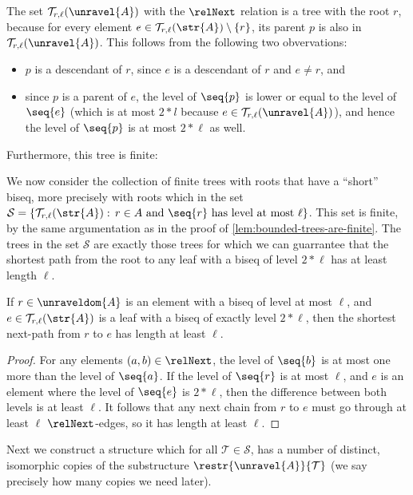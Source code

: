 \noindent
The set $\mathcal{T}_{r,\ell}(\unravel{A})$ with the $\relNext$ relation is a tree with the root $r$, because for every element $e \in \mathcal{T}_{r,\ell}(\str{A}) \setminus \{r\}$, its parent $p$ is also in $\mathcal{T}_{r,\ell}(\unravel{A})$.
This follows from the following two obvervations:
\begin{itemize}
  \item $p$ is a descendant of $r$, since $e$ is a descendant of $r$ and $e \neq r$, and
  \item since $p$ is a parent of $e$, the level of $\seq{p}$ is lower or equal to the level of $\seq{e}$ (which is at most $2 * l$ because $e \in \mathcal{T}_{r,\ell}(\unravel{A})$), and hence the level of $\seq{p}$ is at most $2 * \ell$ as well.
\end{itemize}
Furthermore, this tree is finite:

\noindent
We now consider the collection of finite trees with roots that have a ``short'' biseq, more precisely with roots which in the set $\mathcal{S} = \left\{ \mathcal{T}_{r,\ell}(\str{A}):\, r \in A \text{ and } \seq{r}\ \text{has level at most $\ell$}\right\}$.
This set is finite, by the same argumentation as in the proof of \cref{lem:bounded-trees-are-finite}.
The trees in the set $\mathcal{S}$ are exactly those trees for which we can guarrantee that the shortest path from the root to any leaf with a biseq of level $2 * \ell$ has at least length $\ell$.
\begin{lemma}\label{lem:bounded-trees-shortest-next-path}
  If $r \in \unraveldom{A}$ is an element with a biseq of level at most $\ell$, and $e \in \mathcal{T}_{r,\ell}(\str{A})$ is a leaf with a biseq of exactly level $2 * \ell$, then the shortest next-path from $r$ to $e$ has length at least $\ell$.
\end{lemma}
\begin{proof}
  For any elements $(a,b) \in \relNext$, the level of $\seq{b}$ is at most one more than the level of $\seq{a}$.
  If the level of $\seq{r}$ is at most $\ell$, and $e$ is an element where the level of $\seq{e}$ is $2 * \ell$, then the difference between both levels is at least $\ell$.
  It follows that any next chain from $r$ to $e$ must go through at least $\ell$ $\relNext$-edges, so it has length at least $\ell$.
\end{proof}
Next we construct a structure which for all $\mathcal{T} \in \mathcal{S}$, has a number of distinct, isomorphic copies of the substructure $\restr{\unravel{A}}{\mathcal{T}}$ (we say precisely how many copies we need later).
